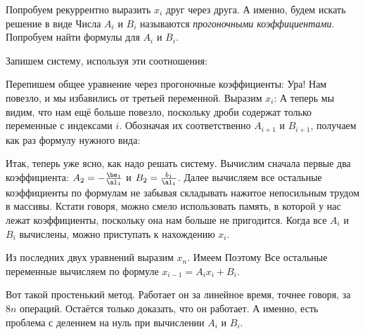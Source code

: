 \documentclass[a4paper]{article}
\begin{document}
Попробуем рекуррентно выразить $x_i$ друг через друга. А именно, будем искать решение в виде
Числа $A_i$ и $B_i$ называются \emph{прогоночными коэффициентами}.
Попробуем найти формулы для $A_i$ и $B_i$.

Запишем систему, используя эти соотношения:

Перепишем общее уравнение через прогоночные коэффициенты:
Ура! Нам повезло, и мы избавились от третьей переменной. Выразим $x_i$:
А теперь мы видим, что нам ещё больше повезло, поскольку дроби содержат только переменные с индексами $i$.
Обозначая их соответственно $A_{i+1}$ и $B_{i+1}$, получаем как раз формулу нужного вида:

Итак, теперь уже ясно, как надо решать систему. Вычислим сначала первые два коэффициента:
$A_2 = -\frac{\be_1}{\al_1}$ и $B_2 = \frac{b_1}{\al_1}$.
Далее вычисляем все остальные коэффициенты по формулам
не забывая складывать нажитое непосильным трудом в массивы. Кстати говоря, можно смело использовать память, в которой
у нас лежат коэффициенты, поскольку она нам больше не пригодится.
Когда все $A_i$ и $B_i$ вычислены, можно приступать к нахождению $x_i$.

Из последних  двух уравнений выразим $x_n$. Имеем
Поэтому
Все остальные переменные вычисляем по формуле $x_{i-1} = A_i x_i + B_i$.

Вот такой простенький метод. Работает он за линейное время, точнее говоря, за $8n$ операций.
Остаётся только доказать, что он работает. А именно, есть проблема с делением на нуль при вычислении $A_i$ и $B_i$.
\end{document}
